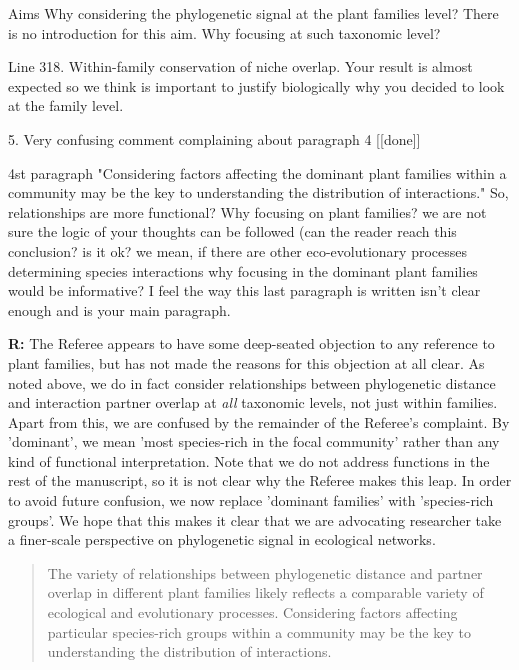 \documentclass[12pt]{letter}
\newenvironment{refquote}{\bigskip \begin{it}}{\end{it}\smallskip}
\begin{document}
		\begin{refquote}
		Aims
		Why considering the phylogenetic signal at the plant families level? There is no introduction for this aim. Why focusing at such taxonomic level?
		\end{refquote}


		\begin{refquote}
			Line 318. Within-family conservation of niche overlap. Your result is almost expected so we think is important to justify biologically why you decided to look at the family level.
		\end{refquote}


	5. Very confusing comment complaining about paragraph 4 [[done]]

		\begin{refquote}
		4st paragraph "Considering factors affecting the dominant plant families within
		a community may be the key to understanding the distribution of interactions." So, relationships are more functional? Why focusing on plant families? we are not sure the logic of your thoughts can be followed (can the reader reach this conclusion? is it ok? we mean, if there are other eco-evolutionary processes determining species interactions why focusing in the dominant plant families would be informative? I feel the way this last paragraph is written isn't clear enough and is your main paragraph.
		\end{refquote}


		\textbf{R:} The Referee appears to have some deep-seated objection to any reference to plant families, but has not made the reasons for this objection at all clear. As noted above, we do in fact consider relationships between phylogenetic distance and interaction partner overlap at \emph{all} taxonomic levels, not just within families. Apart from this, we are confused by the remainder of the Referee's complaint. By 'dominant', we mean 'most species-rich in the focal community' rather than any kind of functional interpretation. Note that we do not address functions in the rest of the manuscript, so it is not clear why the Referee makes this leap. In order to avoid future confusion, we now replace 'dominant families' with 'species-rich groups'. We hope that this makes it clear that we are advocating researcher take a finer-scale perspective on phylogenetic signal in ecological networks.


		\begin{quotation}
		    \item The variety of relationships between phylogenetic distance and partner overlap in different plant families likely reflects a comparable variety of ecological and evolutionary processes. Considering factors affecting particular species-rich groups within a community may be the key to understanding the distribution of interactions.
		\end{quotation}
\end{document}
